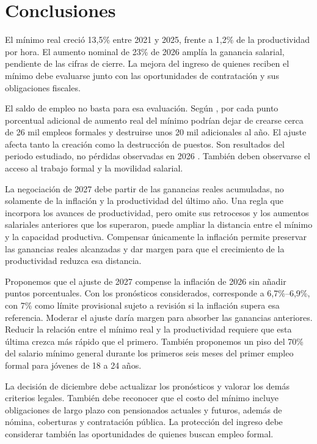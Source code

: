 \section{Conclusiones}
\label{sec:conclusiones}

El mínimo real creció 13,5\% entre 2021 y 2025, frente a 1,2\% de la productividad por hora. El aumento nominal de 23\% de 2026 amplía la ganancia salarial, pendiente de las cifras de cierre. La mejora del ingreso de quienes reciben el mínimo debe evaluarse junto con las oportunidades de contratación y sus obligaciones fiscales.

El saldo de empleo no basta para esa evaluación. Según \citet{florez2022}, por cada punto porcentual adicional de aumento real del mínimo podrían dejar de crearse cerca de 26 mil empleos formales y destruirse unos 20 mil adicionales al año. El ajuste afecta tanto la creación como la destrucción de puestos. Son resultados del periodo estudiado, no pérdidas observadas en 2026 \citep[cuadro~1]{banrepFlujos2022}. También deben observarse el acceso al trabajo formal y la movilidad salarial.

La negociación de 2027 debe partir de las ganancias reales acumuladas, no solamente de la inflación y la productividad del último año. Una regla que incorpora los avances de productividad, pero omite sus retrocesos y los aumentos salariales anteriores que los superaron, puede ampliar la distancia entre el mínimo y la capacidad productiva. Compensar únicamente la inflación permite preservar las ganancias reales alcanzadas y dar margen para que el crecimiento de la productividad reduzca esa distancia.

Proponemos que el ajuste de 2027 compense la inflación de 2026 sin añadir puntos porcentuales. Con los pronósticos considerados, corresponde a 6,7\%--6,9\%, con 7\% como límite provisional sujeto a revisión si la inflación supera esa referencia. Moderar el ajuste daría margen para absorber las ganancias anteriores. Reducir la relación entre el mínimo real y la productividad requiere que esta última crezca más rápido que el primero. También proponemos un piso del 70\% del salario mínimo general durante los primeros seis meses del primer empleo formal para jóvenes de 18 a 24 años.

La decisión de diciembre debe actualizar los pronósticos y valorar los demás criterios legales. También debe reconocer que el costo del mínimo incluye obligaciones de largo plazo con pensionados actuales y futuros, además de nómina, coberturas y contratación pública. La protección del ingreso debe considerar también las oportunidades de quienes buscan empleo formal.


